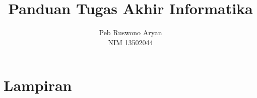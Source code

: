 \documentclass[12pt, a4paper, onecolumn, oneside, final]{report}
\begin{document}
    \title{Panduan Tugas Akhir Informatika}
    \date{}
    \author{
        Peb Ruswono Aryan \\
        NIM 13502044
    }

    \setcounter{page}{0}

    
    
    

    \pagestyle{plain}

    
    
    

    \tableofcontents
    \listoffigures
    \listoftables

    \setcounter{page}{0}
    \renewcommand{\chaptername}{Bab}
    \renewcommand{\thechapter}{\Roman{chapter}}

    
    
    
    
    

    \printbibliography

    \appendix

    \part*{Lampiran}

    
    
\end{document}
